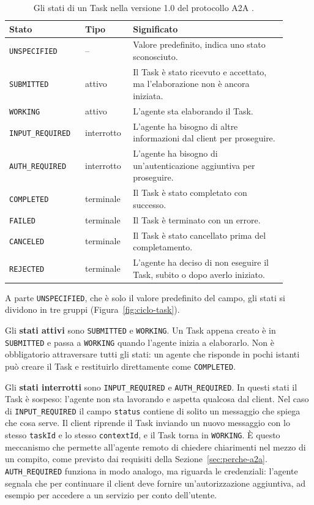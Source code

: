 \begin{table}[htbp]
    \centering
    \small
    \begin{tabular}{p{0.25\linewidth} p{0.14\linewidth} p{0.51\linewidth}}
        \hline
        \textbf{Stato} & \textbf{Tipo} & \textbf{Significato} \\
        \hline
        \texttt{UNSPECIFIED} & -- & Valore predefinito, indica uno stato sconosciuto. \\
        \texttt{SUBMITTED} & attivo & Il Task è stato ricevuto e accettato, ma l'elaborazione non è ancora iniziata. \\
        \texttt{WORKING} & attivo & L'agente sta elaborando il Task. \\
        \texttt{INPUT\_\allowbreak REQUIRED} & interrotto & L'agente ha bisogno di altre informazioni dal client per proseguire. \\
        \texttt{AUTH\_REQUIRED} & interrotto & L'agente ha bisogno di un'autenticazione aggiuntiva per proseguire. \\
        \texttt{COMPLETED} & terminale & Il Task è stato completato con successo. \\
        \texttt{FAILED} & terminale & Il Task è terminato con un errore. \\
        \texttt{CANCELED} & terminale & Il Task è stato cancellato prima del completamento. \\
        \texttt{REJECTED} & terminale & L'agente ha deciso di non eseguire il Task, subito o dopo averlo iniziato. \\
        \hline
    \end{tabular}
    \caption{Gli stati di un Task nella versione 1.0 del protocollo A2A \cite{a2aspec}.}
    \label{tab:stati-task}
\end{table}

A parte \texttt{UNSPECIFIED}, che è solo il valore predefinito del campo, gli stati si dividono in tre gruppi (Figura~\ref{fig:ciclo-task}).

Gli \textbf{stati attivi} sono \texttt{SUBMITTED} e \texttt{WORKING}. Un Task appena creato è in \texttt{SUBMITTED} e passa a \texttt{WORKING} quando l'agente inizia a elaborarlo. Non è obbligatorio attraversare tutti gli stati: un agente che risponde in pochi istanti può creare il Task e restituirlo direttamente come \texttt{COMPLETED}.

Gli \textbf{stati interrotti} sono \texttt{INPUT\_\allowbreak REQUIRED} e \texttt{AUTH\_REQUIRED}. In questi stati il Task è sospeso: l'agente non sta lavorando e aspetta qualcosa dal client. Nel caso di \texttt{INPUT\_\allowbreak REQUIRED} il campo \texttt{status} contiene di solito un messaggio che spiega che cosa serve. Il client riprende il Task inviando un nuovo messaggio con lo stesso \texttt{taskId} e lo stesso \texttt{contextId}, e il Task torna in \texttt{WORKING}. È questo meccanismo che permette all'agente remoto di chiedere chiarimenti nel mezzo di un compito, come previsto dai requisiti della Sezione~\ref{sec:perche-a2a}. \texttt{AUTH\_REQUIRED} funziona in modo analogo, ma riguarda le credenziali: l'agente segnala che per continuare il client deve fornire un'autorizzazione aggiuntiva, ad esempio per accedere a un servizio per conto dell'utente.

